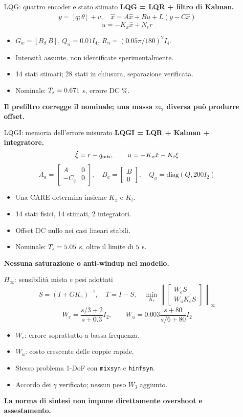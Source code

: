 \documentclass[aspectratio=169,12pt]{beamer}
\newcommand{\good}[1]{\textcolor{accent}{\textbf{#1}}}
\newcommand{\bad}[1]{\textcolor{warn}{\textbf{#1}}}
\begin{document}
\begin{frame}{LQG: quattro encoder e stato stimato}
\good{LQG = LQR + filtro di Kalman.}
\[y=[q;\theta]+v,\quad\dot{\hat x}=A\hat x+Bu+L(y-C\hat x)\]
\[u=-K_x\hat x+N_rr\]
\small
\begin{itemize}
\item $G_w=[B_d\ B]$, $Q_n=0.01I_4$, $R_n=(0.05\pi/180)^2I_4$.
\item Intensità assunte, non identificate sperimentalmente.
\item 14 stati stimati; 28 stati in chiusura, separazione verificata.
\item Nominale: $T_s=\num{0.671}$ s, errore DC \FinLQGEss\%.
\end{itemize}
\bad{Il prefiltro corregge il nominale; una massa $m_2$ diversa può produrre offset.}
\end{frame}

\begin{frame}{LQGI: memoria dell'errore misurato}
\good{LQGI = LQR + Kalman + integratore.}
\[\dot\xi=r-q_{\rm mis},\qquad u=-K_x\hat x-K_i\xi\]
\small
\[A_a=\begin{bmatrix}A&0\\-C_q&0\end{bmatrix},\quad B_a=\begin{bmatrix}B\\0\end{bmatrix},
\quad Q_a=\mathrm{diag}(Q,200I_2)\]
\begin{itemize}
\item Una CARE determina insieme $K_x$ e $K_i$.
\item 14 stati fisici, 14 stimati, 2 integratori.
\item Offset DC nullo nei casi lineari stabili.
\item Nominale: $T_s=\num{5.05}$ s, oltre il limite di $5$ s.
\end{itemize}
\bad{Nessuna saturazione o anti-windup nel modello.}
\end{frame}

\begin{frame}{$H_\infty$: sensibilità mista e pesi adottati}
\small
\[S=(I+GK_e)^{-1},\quad T=I-S,\quad
\min_{K_e}\left\|\begin{bmatrix}W_eS\\W_uK_eS\end{bmatrix}\right\|_\infty\]
\[W_e=\frac{s/3+2}{s+0.3}I_2,\qquad W_u=0.003\frac{s+80}{s/6+80}I_2\]
\begin{itemize}
\item $W_e$: errore soprattutto a bassa frequenza.
\item $W_u$: costo crescente delle coppie rapide.
\item Stesso problema 1-DoF con \texttt{mixsyn} e \texttt{hinfsyn}.
\item Accordo dei $\gamma$ verificato; nessun peso $W_3$ aggiunto.
\end{itemize}
\bad{La norma di sintesi non impone direttamente overshoot e assestamento.}
\end{frame}
\end{document}
